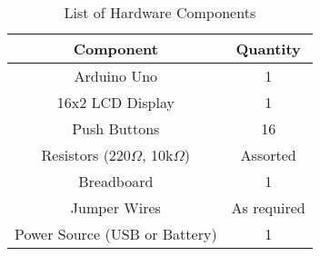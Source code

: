 \begin{table}[h]
\centering
\begin{tabular}{|c|c|}
\hline
\textbf{Component} & \textbf{Quantity} \\ 
\hline
Arduino Uno & 1 \\ 
\hline
16x2 LCD Display & 1 \\ 
\hline
Push Buttons & 16 \\ 
\hline
Resistors (220$\Omega$, 10k$\Omega$) & Assorted \\ 
\hline
Breadboard & 1 \\ 
\hline
Jumper Wires & As required \\ 
\hline
Power Source (USB or Battery) & 1 \\ 
\hline
\end{tabular}
\caption{List of Hardware Components}
\label{tab:components}
\end{table}
